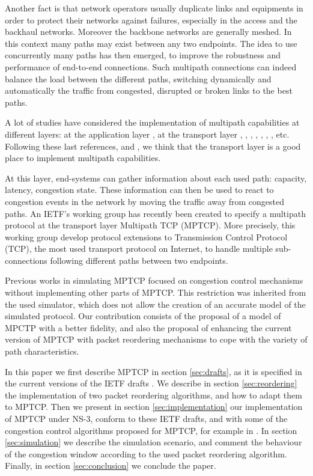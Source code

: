 \documentclass{sig-alternate}
\begin{document}
Another fact is that network operators usually duplicate links and equipments in order to protect their networks against failures, especially in the access and the backhaul networks. 
Moreover the backbone networks are generally meshed.
In this context many paths may exist between any two endpoints. The idea to use concurrently many paths has then emerged, to improve the robustness and performance of end-to-end connections. Such multipath connections can indeed balance the load between the different paths, switching dynamically and automatically the traffic from congested, disrupted or broken links to the best paths.  

A lot of studies have considered the implementation of multipath capabilities at different layers: at the application layer \cite{hacker02}, at the transport layer \cite{ong02}, \cite{hasegawa05}, \cite{dong07}, \cite{sarkar06}, \cite{zhang04}, \cite{rojviboonchai02}, \cite{hasegawa05}, etc.
Following these last references, and \cite{wischik08}, we think that the transport layer is a good place to implement multipath capabilities.

At this layer, end-systems can gather information about each used path: capacity, latency, congestion state. These information can then be used to react to congestion events in the network by moving the traffic away from congested paths.
An IETF's working group has recently been created to specify a multipath protocol at the transport layer Multipath TCP \cite{ford10} (MPTCP). More precisely, this working group develop protocol extensions to Transmission Control Protocol (TCP), the most used transport protocol on Internet, to handle multiple sub-connections following different paths between two endpoints. 

Previous works in simulating MPTCP \cite{htsim} focused on congestion control mechanisms without implementing other parts of MPTCP. This restriction was inherited from the used simulator, which does not allow the creation of an accurate model of the simulated protocol. Our contribution consists of the proposal of a model of MPCTP with a better fidelity, and also the proposal of enhancing the current version of MPTCP with packet reordering mechanisms to cope with the variety of path characteristics.    

In this paper we first describe MPTCP in section \ref{sec:drafts}, as it is specified in the current versions of the IETF drafts \cite{ford10}. We describe in section \ref{sec:reordering} the implementation of two packet reordering algorithms, and how to adapt them to MPTCP.
Then we present in section \ref{sec:implementation} our implementation of MPTCP under NS-3, conform to these IETF drafts, and with some of the congestion control algorithms proposed for MPTCP, for example in \cite{raiciu09}. 
In section \ref{sec:simulation} we describe the simulation scenario, and comment the behaviour of the congestion window according to the used packet reordering algorithm.
Finally, in section \ref{sec:conclusion} we conclude the paper.
\end{document}
